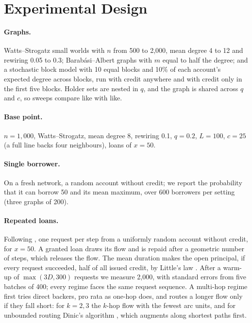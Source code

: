 \documentclass[11pt]{article}
\theoremstyle{plain}
\theoremstyle{definition}
\begin{document}
\section{Experimental Design}\label{sec:design}

\paragraph{Graphs.} Watts--Strogatz small worlds \citep{watts1998} with $n$ from 500 to 2,000, mean
degree 4 to 12 and rewiring 0.05 to 0.3; Barab\'asi--Albert graphs \citep{barabasi1999} with $m$ equal
to half the degree; and a stochastic block model \citep{holland1983} with 10 equal blocks and 10\% of
each account's expected degree across blocks, run with credit anywhere and with credit only in the
first five blocks. Holder sets are nested in $q$, and the graph is shared across $q$ and $c$, so
sweeps compare like with like.

\paragraph{Base point.} $n=1{,}000$, Watts--Strogatz, mean degree 8, rewiring 0.1, $q=0.2$,
$L=100$, $c=25$ (a full line backs four neighbours), loans of $x=50$.

\paragraph{Single borrower.} On a fresh network, a random account without credit; we report the
probability that it can borrow 50 and its mean maximum, over 600 borrowers per setting (three graphs
of 200).

\paragraph{Repeated loans.} Following \citet{dandekar2011liquidity}, one request per step from a
uniformly random account without credit, for $x=50$. A granted loan draws its flow and is repaid
after a geometric number of steps, which releases the flow. The mean duration makes the open
principal, if every request succeeded, half of all issued credit, by Little's law \citep{little1961}.
After a warm-up of $\max(3D,300)$ requests we measure 2,000, with standard errors from five batches of
400; every regime faces the same request sequence. A multi-hop regime first tries direct backers, pro
rata as one-hop does, and routes a longer flow only if they fall short: for $k=2,3$ the $k$-hop flow
with the fewest arc units, and for unbounded routing Dinic's algorithm \citep{dinic1970}, which
augments along shortest paths first.
\end{document}
